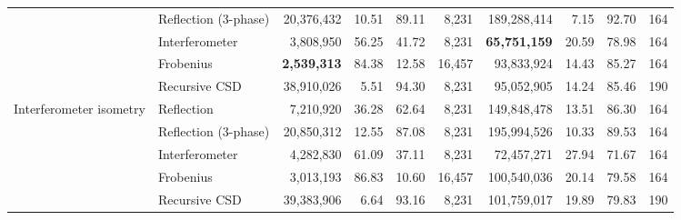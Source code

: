 \begin{table}[htbp]
\begin{tabular}{llrrrrrrrr}
     & Reflection (3-phase) & 20{,}376{,}432 & 10.51 & 89.11 & 8{,}231 & 189{,}288{,}414 & 7.15 & 92.70 & 164 \\
     & Interferometer & 3{,}808{,}950 & 56.25 & 41.72 & 8{,}231 & \textbf{65{,}751{,}159} & 20.59 & 78.98 & 164 \\
     & Frobenius & \textbf{2{,}539{,}313} & 84.38 & 12.58 & 16{,}457 & 93{,}833{,}924 & 14.43 & 85.27 & 164 \\
     & Recursive CSD & 38{,}910{,}026 & 5.51 & 94.30 & 8{,}231 & 95{,}052{,}905 & 14.24 & 85.46 & 190 \\
    \midrule
    Interferometer isometry & Reflection & 7{,}210{,}920 & 36.28 & 62.64 & 8{,}231 & 149{,}848{,}478 & 13.51 & 86.30 & 164 \\
     & Reflection (3-phase) & 20{,}850{,}312 & 12.55 & 87.08 & 8{,}231 & 195{,}994{,}526 & 10.33 & 89.53 & 164 \\
     & Interferometer & 4{,}282{,}830 & 61.09 & 37.11 & 8{,}231 & 72{,}457{,}271 & 27.94 & 71.67 & 164 \\
     & Frobenius & 3{,}013{,}193 & 86.83 & 10.60 & 16{,}457 & 100{,}540{,}036 & 20.14 & 79.58 & 164 \\
     & Recursive CSD & 39{,}383{,}906 & 6.64 & 93.16 & 8{,}231 & 101{,}759{,}017 & 19.89 & 79.83 & 190 \\
    \bottomrule
  \end{tabular}
\end{table}
